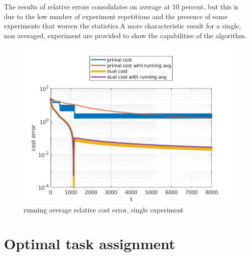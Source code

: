 \documentclass{article}
\begin{document}
The results of relative errors consolidates on average at 10 percent, but this is due to the low number of experiment repetitions and the presence of some experiments that worsen the statistics.A more characteristic result for a single, non averaged, experiment are provided to show the capabilities of the algorithm.\\
\begin{figure}[h!]
    \centering
    \includegraphics[scale=0.25]{images/N6_M9_STCdoubly_TOPbinomial_PRB1_CostPlot.jpg}
    \caption{running average relative cost error, single experiment}
    \label{fig:consensus error plot}
\end{figure}


\newpage
\section{Optimal task assignment}
\end{document}
